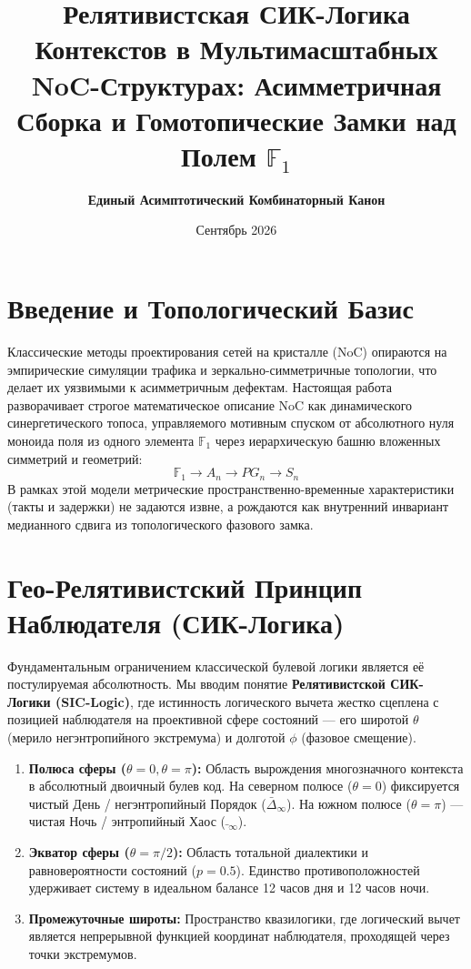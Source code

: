 \documentclass[10pt,twocolumn]{article}
\begin{document}
\title{\textbf{Релятивистская СИК-Логика Контекстов в Мультимасштабных NoC-Структурах: Асимметричная Сборка и Гомотопические Замки над Полем $\mathbb{F}_1$}}
\author{\textbf{Единый Асимптотический Комбинаторный Канон}}
\date{Сентябрь 2026}
\maketitle

\section*{Введение и Топологический Базис}
Классические методы проектирования сетей на кристалле (NoC) опираются на эмпирические симуляции трафика и зеркально-симметричные топологии, что делает их уязвимыми к асимметричным дефектам. Настоящая работа разворачивает строгое математическое описание NoC как динамического синергетического топоса, управляемого мотивным спуском от абсолютного нуля моноида поля из одного элемента $\mathbb{F}_1$ через иерархическую башню вложенных симметрий и геометрий:
\begin{equation}
\mathbb{F}_1 \longrightarrow A_n \longrightarrow PG_n \longrightarrow S_n
\end{equation}
В рамках этой модели метрические пространственно-временные характеристики (такты и задержки) не задаются извне, а рождаются как внутренний инвариант медианного сдвига из топологического фазового замка.

\section{Гео-Релятивистский Принцип Наблюдателя (СИК-Логика)}
Фундаментальным ограничением классической булевой логики является её постулируемая абсолютность. Мы вводим понятие \textbf{Релятивистской СИК-Логики (SIC-Logic)}, где истинность логического вычета жестко сцеплена с позицией наблюдателя на проективной сфере состояний — его широтой $\theta$ (мерило негэнтропийного экстремума) и долготой $\phi$ (фазовое смещение).

\begin{enumerate}
    \item \textbf{Полюса сферы ($\theta = 0, \theta = \pi$):} Область вырождения многозначного контекста в абсолютный двоичный булев код. На северном полюсе ($\theta = 0$) фиксируется чистый День / негэнтропийный Порядок ($\bar{\Delta}_\infty$). На южном полюсе ($\theta = \pi$) — чистая Ночь / энтропийный Хаос ($\bar{\!~}_\infty$).
    \item \textbf{Экватор сферы ($\theta = \pi/2$):} Область тотальной диалектики и равновероятности состояний ($p = 0.5$). Единство противоположностей удерживает систему в идеальном балансе 12 часов дня и 12 часов ночи.
    \item \textbf{Промежуточные широты:} Пространство квазилогики, где логический вычет является непрерывной функцией координат наблюдателя, проходящей через точки экстремумов.
\end{enumerate}
\end{document}
